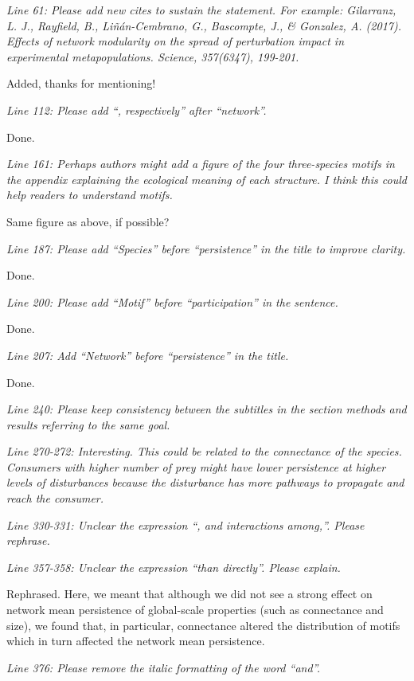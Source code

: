 \documentclass[12pt]{article}
\newcommand{\us}{\rm \setlength{\leftskip}{0.3cm} \setlength{\rightskip}{0.3cm}}
\newcommand{\them}{\it \setlength{\leftskip}{0cm} \setlength{\rightskip}{0cm}}
\begin{document}
\them
Line 61: Please add new cites to sustain the statement. For example:
Gilarranz, L. J., Rayfield, B., Liñán-Cembrano, G., Bascompte, J., \& Gonzalez, A. (2017). Effects of network modularity on the spread of perturbation impact in experimental metapopulations. Science, 357(6347), 199-201.

\us
Added, thanks for mentioning!

\them
Line 112: Please add “, respectively” after “network”.

\us
Done.

\them
Line 161: Perhaps authors might add a figure of the four three-species motifs in the appendix explaining the ecological meaning of each structure. I think this could help readers to understand motifs.

\us Same figure as above, if possible?

\them
Line 187: Please add “Species” before “persistence” in the title to improve clarity.

\us
Done.

\them
Line 200: Please add “Motif” before “participation” in the sentence.

\us
Done.

\them
Line 207: Add “Network” before “persistence” in the title.

\us
Done.

\them
Line 240: Please keep consistency between the subtitles in the section methods and results referring to the same goal.

\us

\them
Line 270-272: Interesting. This could be related to the connectance of the species. Consumers with higher number of prey might have lower persistence at higher levels of disturbances because the disturbance has more pathways to propagate and reach the consumer.

\us 

\them
Line 330-331: Unclear the expression “, and interactions among,”. Please rephrase.

\us

\them
Line 357-358: Unclear the expression “than directly”. Please explain.

\us
Rephrased. Here, we meant that although we did not see a strong effect on network mean persistence of global-scale properties (such as connectance and size), we found that, in particular, connectance altered the distribution of motifs which in turn affected the network mean persistence.  

\them
Line 376: Please remove the italic formatting of the word “and”.
\end{document}
